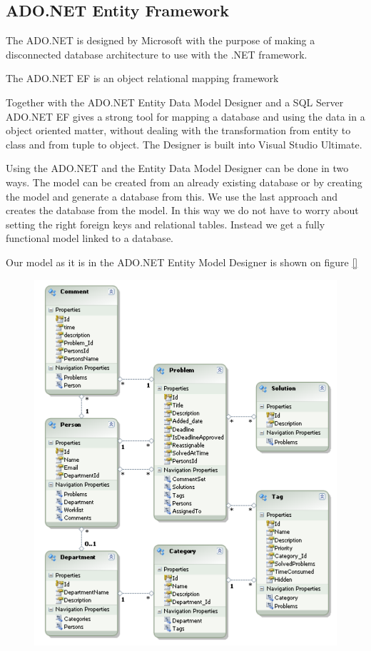 \subsection{ADO.NET Entity Framework}
\label{sub:adonet}
The ADO.NET is designed by Microsoft with the purpose of making a disconnected database architecture to use with the .NET framework. %

The ADO.NET EF is an object relational mapping framework %

Together with the ADO.NET Entity Data Model Designer and a SQL Server ADO.NET EF gives a strong tool for mapping a database and using the data in a object oriented matter, without dealing with the transformation from entity to class and from tuple to object. 
The Designer is built into Visual Studio Ultimate. 

Using the ADO.NET and the Entity Data Model Designer can be done in two ways. 
The  model can be created from an already existing database or by creating the model and generate a database from this. %
We use the last approach and creates the database from the model. 
In this way we do not have to worry about setting the right foreign keys and relational tables. Instead we get a fully functional model linked to a database. 

Our model as it is in the ADO.NET Entity Model Designer is shown on figure \ref{}
\begin{figure}
	\centering
		\includegraphics[scale=0.8]{input/implementation/mvc/Model.pdf}
	\label{fig:balanceWorkloadDiagram}
\end{figure}







